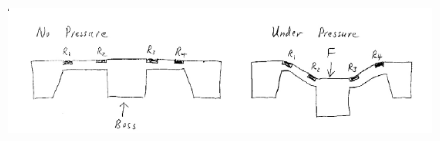 \documentclass{article}
\begin{document}
\begin{figure}[h]
	\centering
	\includegraphics[keepaspectratio,width=\textwidth]{diaphragm}
\end{figure}

\label{end}
\end{document}
